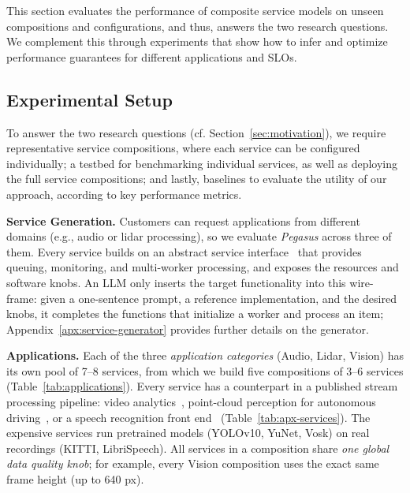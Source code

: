 


This section evaluates the performance of composite service models on unseen compositions and configurations, and thus, answers the two research questions. We complement this through experiments that show how to infer and optimize performance guarantees for different applications and SLOs.

\subsection{Experimental Setup}
%
To answer the two research questions (cf. Section~\ref{sec:motivation}), we require representative service compositions, where each service can be configured individually; a testbed for benchmarking individual services, as well as deploying the full service compositions; and lastly, baselines to evaluate the utility of our approach, according to key performance metrics. 


\vspace{3pt}
\noindent
\textbf{Service Generation.} Customers can request applications from different domains (e.g., audio or lidar processing), so we evaluate \textit{Pegasus} across three of them. Every service builds on an abstract service interface~\cite{sedlak_multi-dimensional_2026} that provides queuing, monitoring, and multi-worker processing, and exposes the resources and software knobs. An LLM only inserts the target functionality into this wire-frame: given a one-sentence prompt, a reference implementation, and the desired knobs, it completes the functions that initialize a worker and process an item; Appendix~\ref{apx:service-generator} provides further details on the generator.

\vspace{3pt}
\noindent
\textbf{Applications.}
Each of the three \textit{application categories} (Audio, Lidar, Vision) has its own pool of 7--8 services, from which we build five compositions of 3--6 services (Table~\ref{tab:applications}). Every service has a counterpart in a published stream processing pipeline: video analytics~\cite{zhang_live_2017,jiang_chameleon_2018,romero_llama_2021}, point-cloud perception for autonomous driving~\cite{kato_autoware_2018,rusu_3d_2011}, or a speech       recognition front end~\cite{povey_kaldi_2011} (Table~\ref{tab:apx-services}). The expensive services run pretrained models (YOLOv10, YuNet, Vosk) on real recordings (KITTI, LibriSpeech). All services in a composition share \textit{one global data quality knob}; for example, every Vision composition uses the exact same frame height (up to 640 px).

